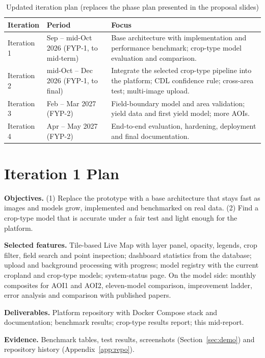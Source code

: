 \begin{table}[htbp]
\centering\small
\caption{Updated iteration plan (replaces the phase plan presented in the proposal slides)}
\label{tab:iterations}
\begin{tabularx}{\textwidth}{L{2.4cm} L{2.6cm} Y}
\toprule
\textbf{Iteration} & \textbf{Period} & \textbf{Focus}\\
\midrule
Iteration 1 & Sep -- mid-Oct 2026 (FYP-1, to mid-term) & Base architecture with implementation and performance benchmark; crop-type model evaluation and comparison.\\
Iteration 2 & mid-Oct -- Dec 2026 (FYP-1, to final) & Integrate the selected crop-type pipeline into the platform; CDL confidence rule; cross-area test; multi-image upload.\\
Iteration 3 & Feb -- Mar 2027 (FYP-2) & Field-boundary model and area validation; yield data and first yield model; more AOIs.\\
Iteration 4 & Apr -- May 2027 (FYP-2) & End-to-end evaluation, hardening, deployment and final documentation.\\
\bottomrule
\end{tabularx}
\end{table}

\section{Iteration 1 Plan}\label{sec:it1plan}
\textbf{Objectives.} (1) Replace the prototype with a base architecture that stays fast as images and
models grow, implemented and benchmarked on real data. (2) Find a crop-type model that is accurate
under a fair test and light enough for the platform.

\textbf{Selected features.} Tile-based Live Map with layer panel, opacity, legends, crop filter,
field search and point inspection; dashboard statistics from the database; upload and background
processing with progress; model registry with the current cropland and crop-type models;
system-status page. On the model side: monthly composites for AOI1 and AOI2, eleven-model
comparison, improvement ladder, error analysis and comparison with published papers.

\textbf{Deliverables.} Platform repository with Docker Compose stack and documentation; benchmark
results; crop-type results report; this mid-report.

\textbf{Evidence.} Benchmark tables, test results, screenshots (Section~\ref{sec:demo}) and
repository history (Appendix~\ref{app:repo}).

